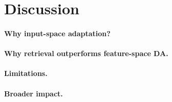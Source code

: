 \section{Discussion}
\label{sec:discussion}



\paragraph{Why input-space adaptation?}

\paragraph{Why retrieval outperforms feature-space DA.}

\paragraph{Limitations.}

\paragraph{Broader impact.}
